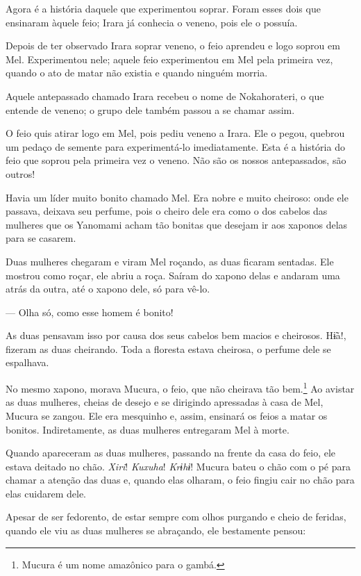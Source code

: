 Agora é a história daquele que experimentou soprar. Foram esses dois que
ensinaram àquele feio; Irara já conhecia o veneno, pois ele o possuía. 

Depois de ter observado Irara soprar veneno, o feio aprendeu e logo
soprou em Mel. Experimentou nele; aquele feio experimentou em Mel pela
primeira vez, quando o ato de matar não existia e quando ninguém
morria. 

Aquele antepassado chamado Irara recebeu o nome de Nokahorateri, o que
entende de veneno; o grupo dele também passou a se chamar assim. 

O feio quis atirar logo em Mel, pois pediu veneno a Irara. Ele o pegou,
quebrou um pedaço de semente para experimentá-lo imediatamente. Esta é a
história do feio que soprou pela primeira vez o veneno. Não são os
nossos antepassados, são outros! 

Havia um líder muito bonito chamado Mel. Era nobre e muito cheiroso:
onde ele passava, deixava seu perfume, pois o cheiro dele era como o dos
cabelos das mulheres que os Yanomami acham tão bonitas que desejam
ir aos xaponos delas para se casarem.

Duas mulheres chegaram e viram Mel roçando, as duas ficaram sentadas. Ele
mostrou como roçar, ele abriu a roça. Saíram do xapono delas e andaram uma
atrás da outra, até o xapono dele, só para vê-lo. 

--- Olha só, como esse homem é bonito! 

As duas pensavam isso por causa dos seus cabelos bem macios e
cheirosos. Hɨ̃a!, fizeram as duas cheirando. Toda a floresta
estava cheirosa, o perfume dele se espalhava. 

No mesmo xapono, morava Mucura, o feio, que não cheirava tão bem.\footnote{Mucura é um nome amazônico para o gambá.} Ao avistar as duas mulheres, cheias de desejo e se
dirigindo apressadas à casa de Mel, Mucura se zangou. Ele era mesquinho
e, assim, ensinará os feios a matar os bonitos. Indiretamente, as
duas mulheres entregaram Mel à morte. 

Quando apareceram as duas mulheres, passando na frente da casa do feio,
ele estava deitado no chão. \textit{Xiri}! \textit{Kuxuha}! \textit{Krɨhɨ}! Mucura bateu o chão com o pé para chamar a atenção das duas e, quando elas olharam, o feio fingiu cair no chão para elas cuidarem dele.

Apesar de ser fedorento, de estar sempre com olhos purgando e cheio de
feridas, quando ele viu as duas mulheres se abraçando, ele bestamente
pensou:

